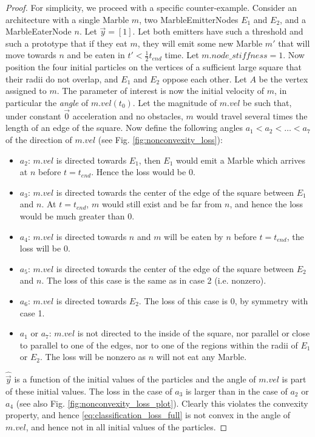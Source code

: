 \begin{proof}
For simplicity, we proceed with a specific counter-example. Consider an architecture with a single Marble $m$, two MarbleEmitterNodes $E_1$ and $E_2$, and a MarbleEaterNode $n$. Let $\vec{y} = [1]$. Let both emitters have such a threshold and such a prototype that if they eat $m$, they will emit some new Marble $m'$ that will move towards $n$ and be eaten in $t' < \frac{1}{2}t_{end}$ time. Let $m.node\_stiffness = 1$. Now position the four initial particles on the vertices of a sufficient large square that their radii do not overlap, and $E_1$ and $E_2$ oppose each other. Let $A$ be the vertex assigned to $m$. The parameter of interest is now the initial velocity of $m$, in particular the \emph{angle} of $m.vel(t_0)$. Let the magnitude of $m.vel$ be such that, under constant $\vec{0}$ acceleration and no obstacles, $m$ would travel several times the length of an edge of the square. 
Now define the following angles $a_1 < a_2 < \dots < a_7$ of the direction of $m.vel$ (see Fig. \ref{fig:nonconvexity_loss}):
\begin{itemize}
    \item $a_2$: $m.vel$ is directed towards $E_1$, then $E_1$ would emit a Marble which arrives at $n$ before $t = t_{end}$. Hence the loss would be 0.
    \item $a_3$: $m.vel$ is directed towards the center of the edge of the square between $E_1$ and $n$. At $t = t_{end}$, $m$ would still exist and be far from $n$, and hence the loss would be much greater than 0.
    \item $a_4$: $m.vel$ is directed towards $n$ and $m$ will be eaten by $n$ before $t = t_{end}$, the loss will be 0.
    \item $a_5$: $m.vel$ is directed towards the center of the edge of the square between $E_2$ and $n$. The loss of this case is the same as in case 2 (i.e. nonzero).
    \item $a_6$: $m.vel$ is directed towards $E_2$. The loss of this case is 0, by symmetry with case 1.
    \item $a_1$ or $a_7$: $m.vel$ is not directed to the inside of the square, nor parallel or close to parallel to one of the edges, nor to one of the regions within the radii of $E_1$ or $E_2$. The loss will be nonzero as $n$ will not eat any Marble.
\end{itemize}
$\hat{\vec{y}}$ is a function of the initial values of the particles and the angle of $m.vel$ is part of these initial values. The loss in the case of $a_3$ is larger than in the case of $a_2$ or $a_4$ (see also Fig. \ref{fig:nonconvexity_loss_plot}). Clearly this violates the convexity property, and hence \eqref{eq:classification_loss_full} is not convex in the angle of $m.vel$, and hence not in all initial values of the particles.
\end{proof}

